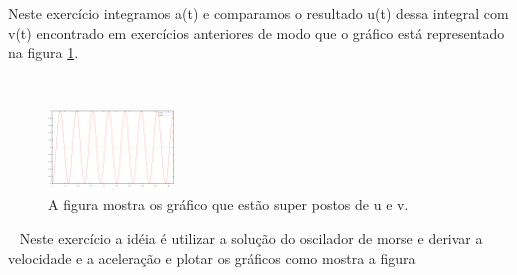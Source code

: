 \documentclass[a4wide]{report}
\begin{document}
 Neste exercício integramos a(t) e comparamos o resultado u(t) dessa integral com v(t) encontrado em exercícios anteriores de modo que o gráfico está representado na figura \ref{03c}.

\
\begin{figure}[h]
\centering
\includegraphics[width=0.30\textwidth]{03c.pdf}
\caption{A figura mostra os gráfico que estão super postos de u e v.}
\label{03c}
\end{figure}
\
 Neste exercício a idéia é utilizar a solução do oscilador de morse e derivar a velocidade e a aceleração e plotar os gráficos como mostra a figura 
\end{document}
